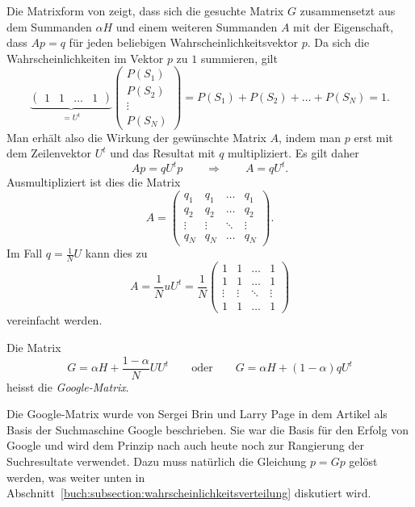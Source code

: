 Die Matrixform von
\label{buch:google:eqn:composed}
zeigt, dass sich die gesuchte Matrix $G$ zusammensetzt aus dem Summanden
$\alpha H$ und einem weiteren Summanden $A$ mit der Eigenschaft, dass
$Ap = q$ für jeden beliebigen Wahrscheinlichkeitsvektor $p$.
Da sich die Wahrscheinlichkeiten im Vektor $p$ zu $1$ summieren, gilt
\[
\underbrace{
\begin{pmatrix}
1&1&\dots&1
\end{pmatrix}
}_{\displaystyle = U^t}
\begin{pmatrix}
P(S_1)\\
P(S_2)\\
\vdots\\
P(S_N)
\end{pmatrix}
=
P(S_1)+P(S_2)+\dots+P(S_N)=1.
\]
Man erhält also die Wirkung der gewünschte Matrix $A$, indem man $p$
erst mit dem Zeilenvektor $U^t$ und das Resultat mit $q$ multipliziert.
Es gilt daher
\[
Ap = qU^tp
\qquad\Rightarrow\qquad
A=qU^t.
\]
Ausmultipliziert ist dies die Matrix
\[
A=\begin{pmatrix}
q_1&q_1&\dots&q_1\\
q_2&q_2&\dots&q_2\\
\vdots&\vdots&\ddots&\vdots\\
q_N&q_N&\dots&q_N
\end{pmatrix}.
\]
Im Fall $q=\frac1NU$ kann dies zu
\[
A
=
\frac1N uU^t
=
\frac1N
\begin{pmatrix}
1&1&\dots&1\\
1&1&\dots&1\\
\vdots&\vdots&\ddots&\vdots\\
1&1&\dots&1
\end{pmatrix}
\]
vereinfacht werden.

\begin{definition}
Die Matrix
\begin{equation}
G
=
\alpha H
+
\frac{1-\alpha}{N}
UU^t
\qquad\text{oder}\qquad
G
=
\alpha H
+
(1-\alpha)qU^t
\label{buch:wahrscheinlichkeit:eqn:google-matrix}
\end{equation}
heisst die
{\em Google-Matrix}.
%
\end{definition}

Die Google-Matrix wurde von Sergei Brin und Larry Page 
in dem Artikel \cite{BRIN1998107} als Basis der Suchmaschine
Google beschrieben.
Sie war die Basis für den Erfolg von Google und wird dem Prinzip nach
auch heute noch zur Rangierung der Suchresultate verwendet.
Dazu muss natürlich die Gleichung $p=Gp$ gelöst werden, was
weiter unten in Abschnitt~\ref{buch:subsection:wahrscheinlichkeitsverteilung}
diskutiert wird.


